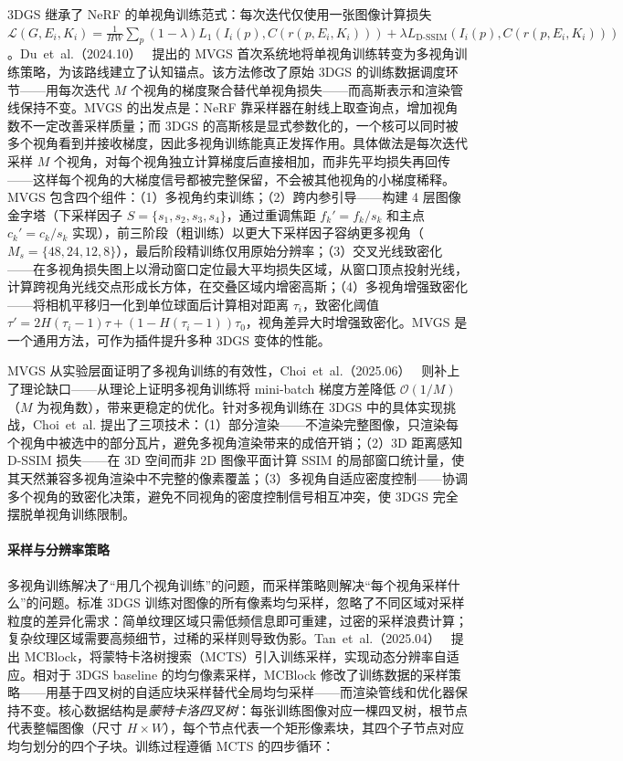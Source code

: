 3DGS 继承了 NeRF 的单视角训练范式：每次迭代仅使用一张图像计算损失 $\mathcal{L}(G, E_i, K_i) = \frac{1}{HW}\sum_{p} (1-\lambda)L_1(I_i(p), C(r(p, E_i, K_i))) + \lambda L_{\text{D-SSIM}}(I_i(p), C(r(p, E_i, K_i)))$。Du~et~al.（2024.10）~\cite{2410_02103} 提出的 MVGS 首次系统地将单视角训练转变为多视角训练策略，为该路线建立了认知锚点。该方法修改了原始 3DGS 的训练数据调度环节——用每次迭代 $M$ 个视角的梯度聚合替代单视角损失——而高斯表示和渲染管线保持不变。MVGS 的出发点是：NeRF 靠采样器在射线上取查询点，增加视角数不一定改善采样质量；而 3DGS 的高斯核是显式参数化的，一个核可以同时被多个视角看到并接收梯度，因此多视角训练能真正发挥作用。具体做法是每次迭代采样 $M$ 个视角，对每个视角独立计算梯度后直接相加，而非先平均损失再回传——这样每个视角的大梯度信号都被完整保留，不会被其他视角的小梯度稀释。MVGS 包含四个组件：（1）多视角约束训练；（2）跨内参引导——构建 4 层图像金字塔（下采样因子 $S = \{s_1, s_2, s_3, s_4\}$，通过重调焦距 $f_k' = f_k/s_k$ 和主点 $c_k' = c_k/s_k$ 实现），前三阶段（粗训练）以更大下采样因子容纳更多视角（$M_s = \{48, 24, 12, 8\}$），最后阶段精训练仅用原始分辨率；（3）交叉光线致密化——在多视角损失图上以滑动窗口定位最大平均损失区域，从窗口顶点投射光线，计算跨视角光线交点形成长方体，在交叠区域内增密高斯；（4）多视角增强致密化——将相机平移归一化到单位球面后计算相对距离 $\tau_i$，致密化阈值 $\tau' = 2H(\tau_i - 1)\tau + (1 - H(\tau_i - 1))\tau_0$，视角差异大时增强致密化。MVGS 是一个通用方法，可作为插件提升多种 3DGS 变体的性能。

MVGS 从实验层面证明了多视角训练的有效性，Choi~et~al.（2025.06）~\cite{2506_12727} 则补上了理论缺口——从理论上证明多视角训练将 mini-batch 梯度方差降低 $\mathcal{O}(1/M)$（$M$ 为视角数），带来更稳定的优化。针对多视角训练在 3DGS 中的具体实现挑战，Choi~et~al. 提出了三项技术：（1）部分渲染——不渲染完整图像，只渲染每个视角中被选中的部分瓦片，避免多视角渲染带来的成倍开销；（2）3D 距离感知 D-SSIM 损失——在 3D 空间而非 2D 图像平面计算 SSIM 的局部窗口统计量，使其天然兼容多视角渲染中不完整的像素覆盖；（3）多视角自适应密度控制——协调多个视角的致密化决策，避免不同视角的密度控制信号相互冲突，使 3DGS 完全摆脱单视角训练限制。

\paragraph{采样与分辨率策略}

多视角训练解决了``用几个视角训练''的问题，而采样策略则解决``每个视角采样什么''的问题。标准 3DGS 训练对图像的所有像素均匀采样，忽略了不同区域对采样粒度的差异化需求：简单纹理区域只需低频信息即可重建，过密的采样浪费计算；复杂纹理区域需要高频细节，过稀的采样则导致伪影。Tan~et~al.（2025.04）~\cite{2504_09878} 提出 MCBlock，将蒙特卡洛树搜索（MCTS）引入训练采样，实现动态分辨率自适应。相对于 3DGS baseline 的均匀像素采样，MCBlock 修改了训练数据的采样策略——用基于四叉树的自适应块采样替代全局均匀采样——而渲染管线和优化器保持不变。核心数据结构是\emph{蒙特卡洛四叉树}：每张训练图像对应一棵四叉树，根节点代表整幅图像（尺寸 $H \times W$），每个节点代表一个矩形像素块，其四个子节点对应均匀划分的四个子块。训练过程遵循 MCTS 的四步循环：


